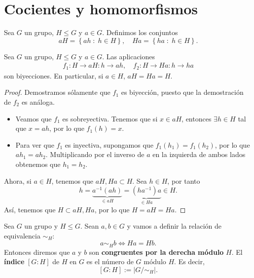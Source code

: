\chapter{Cocientes y homomorfismos}
\begin{definition}
Sea $\displaystyle G $ un grupo, $\displaystyle H \leq G $ y $\displaystyle a \in G $. Definimos los conjuntos
\[aH = \left\{ ah \; : \; h \in H\right\} , \quad Ha = \left\{ ha \; : \; h \in H\right\}  .\]
\end{definition}
\begin{lema}
Sea $\displaystyle G $ un grupo, $\displaystyle H \leq G $ y $\displaystyle a \in G $. Las aplicaciones
\[
\begin{split}
f_{1} : H \to aH : h \to ah, \quad f_{2} : H \to Ha : h \to ha 
\end{split}
\]
son biyecciones. En particular, si $\displaystyle a \in H $, $\displaystyle aH = Ha = H $.
\end{lema}
\begin{proof}
Demostramos sólamente que $\displaystyle f_{1} $ es biyección, puesto que la demostración de $\displaystyle f_{2} $ es análoga. 
\begin{itemize}
\item Veamos que $\displaystyle f_{1} $ es sobreyectiva. Tenemos que si $\displaystyle x \in aH $, entonces $\displaystyle \exists h \in H $ tal que $\displaystyle x = ah $, por lo que $\displaystyle f_{1}\left(h\right) = x $.
\item Para ver que $\displaystyle f_{1} $ es inyectiva, supongamos que $\displaystyle f_{1}\left(h_{1}\right) = f_{1}\left(h_{2}\right) $, por lo que $\displaystyle ah_{1} = ah_{2} $. Multiplicando por el inverso de  $\displaystyle a $ en la izquierda de ambos lados obtenemos que $\displaystyle h_{1} = h_{2} $.
\end{itemize}
Ahora, si $\displaystyle a \in H $, tenemos que $\displaystyle aH, Ha \subset H $. Sea $\displaystyle h \in H $, por tanto
\[h =\underbrace{ a^{-1}\left(ah\right)}_{\in aH} = \underbrace{\left(ha^{-1}\right)a}_{\in Ha} \in H .\]
Así, tenemos que $\displaystyle H \subset aH,Ha $, por lo que $\displaystyle H = aH = Ha $.
\end{proof}
\begin{definition}
Sea $\displaystyle G $ un grupo y $\displaystyle H \leq G $. Sean $\displaystyle a,b \in G $ y vamos a definir la relación de equivalencia $\displaystyle \sim_{H} $:
\[a\sim_{H} b \iff Ha = Hb .\]
Entonces diremos que $\displaystyle a $ y $\displaystyle b $ son \textbf{congruentes por la derecha módulo} $\displaystyle H $. El \textbf{índice} $\displaystyle [G:H] $ de $\displaystyle H $ en $\displaystyle G $ es el número de $\displaystyle G $ módulo $\displaystyle H $. Es decir, 
\[ [G : H] := \left|G/\sim_{H}\right| .\]
\end{definition}
